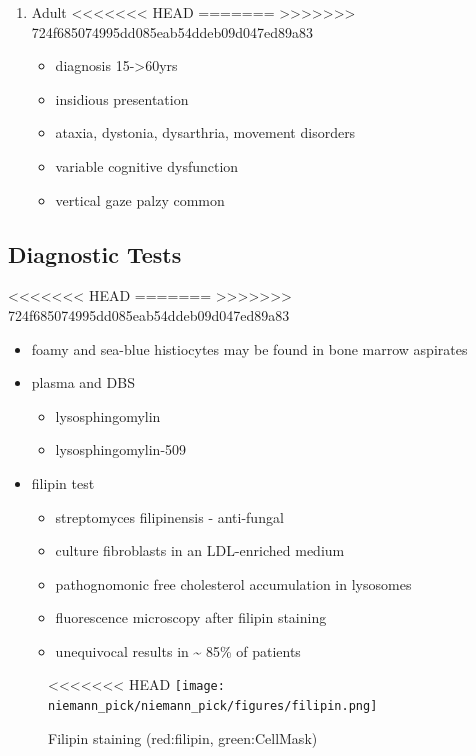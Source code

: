 \documentclass[fontsize=12pt]{scrartcl}
\begin{document}
\begin{enumerate}
\begin{enumerate}
\begin{enumerate}
\begin{enumerate}
\begin{table}[htbp]
\begin{enumerate}
\begin{enumerate}
\begin{enumerate}
\begin{enumerate}
\begin{enumerate}
\item Adult
<<<<<<< HEAD
\label{sec:org70d76d7}
=======
\label{sec:orged99082}
>>>>>>> 724f685074995dd085eab54ddeb09d047ed89a83
\begin{itemize}
\item diagnosis 15->60yrs
\item insidious presentation
\item ataxia, dystonia, dysarthria, movement disorders
\item variable cognitive dysfunction
\item vertical gaze palzy common
\end{itemize}
\end{enumerate}
\end{enumerate}

\subsection{Diagnostic Tests}
<<<<<<< HEAD
\label{sec:org8947238}
=======
\label{sec:orgc36102d}
>>>>>>> 724f685074995dd085eab54ddeb09d047ed89a83
\begin{itemize}
\item foamy and sea-blue histiocytes may be found in bone marrow aspirates
\item plasma and DBS
\begin{itemize}
\item lysosphingomylin
\item lysosphingomylin-509
\end{itemize}
\end{itemize}


\begin{itemize}
\item filipin test
\begin{itemize}
\item streptomyces filipinensis - anti-fungal
\item culture fibroblasts in an LDL-enriched medium
\item pathognomonic free cholesterol accumulation in lysosomes
\item fluorescence microscopy after filipin staining
\item unequivocal results in \textasciitilde{} 85\% of patients
\end{itemize}
\end{itemize}

\begin{figure}[htbp]
\centering
<<<<<<< HEAD
\texttt{[image: niemann\_pick/niemann\_pick/figures/filipin.png]}
\caption{\label{fig:org3bf4246}Filipin staining (red:filipin, green:CellMask)}
\end{figure}


\end{enumerate}
\end{enumerate}
\end{enumerate}
\end{table}
\end{enumerate}
\end{enumerate}
\end{enumerate}
\end{enumerate}
\end{document}
